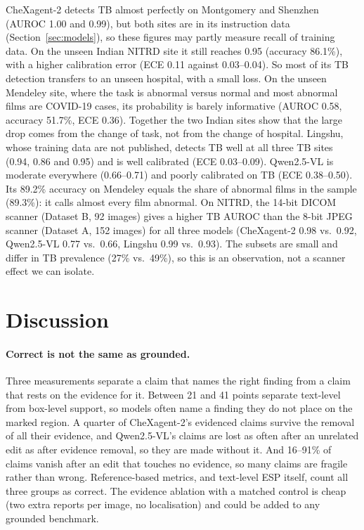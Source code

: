\documentclass[pdflatex,sn-mathphys-num]{sn-jnl}
\theoremstyle{thmstyleone}
\begin{document}
CheXagent-2 detects TB almost perfectly on Montgomery and Shenzhen (AUROC 1.00 and 0.99), but both sites are in its instruction data (Section~\ref{sec:models}), so these figures may partly measure recall of training data. On the unseen Indian NITRD site it still reaches 0.95 (accuracy 86.1\%), with a higher calibration error (ECE 0.11 against 0.03--0.04). So most of its TB detection transfers to an unseen hospital, with a small loss. On the unseen Mendeley site, where the task is abnormal versus normal and most abnormal films are COVID-19 cases, its probability is barely informative (AUROC 0.58, accuracy 51.7\%, ECE 0.36). Together the two Indian sites show that the large drop comes from the change of task, not from the change of hospital. Lingshu, whose training data are not published, detects TB well at all three TB sites (0.94, 0.86 and 0.95) and is well calibrated (ECE 0.03--0.09). Qwen2.5-VL is moderate everywhere (0.66--0.71) and poorly calibrated on TB (ECE 0.38--0.50). Its 89.2\% accuracy on Mendeley equals the share of abnormal films in the sample (89.3\%): it calls almost every film abnormal. On NITRD, the 14-bit DICOM scanner (Dataset B, 92 images) gives a higher TB AUROC than the 8-bit JPEG scanner (Dataset A, 152 images) for all three models (CheXagent-2 0.98 vs.\ 0.92, Qwen2.5-VL 0.77 vs.\ 0.66, Lingshu 0.99 vs.\ 0.93). The subsets are small and differ in TB prevalence (27\% vs.\ 49\%), so this is an observation, not a scanner effect we can isolate.

\section{Discussion}\label{sec:discussion}

\paragraph{Correct is not the same as grounded.} Three measurements separate a claim that names the right finding from a claim that rests on the evidence for it. Between 21 and 41 points separate text-level from box-level support, so models often name a finding they do not place on the marked region. A quarter of CheXagent-2's evidenced claims survive the removal of all their evidence, and Qwen2.5-VL's claims are lost as often after an unrelated edit as after evidence removal, so they are made without it. And 16--91\% of claims vanish after an edit that touches no evidence, so many claims are fragile rather than wrong. Reference-based metrics, and text-level ESP itself, count all three groups as correct. The evidence ablation with a matched control is cheap (two extra reports per image, no localisation) and could be added to any grounded benchmark.
\end{document}
